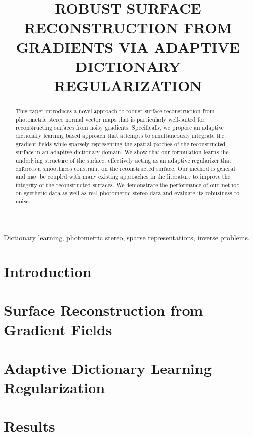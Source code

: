 \documentclass{article}
\title{ROBUST SURFACE RECONSTRUCTION FROM GRADIENTS VIA ADAPTIVE DICTIONARY REGULARIZATION}
\begin{document}

\maketitle

\begin{abstract}
This paper introduces a novel approach to robust surface reconstruction from photometric stereo normal vector maps that is particularly well-suited for reconstructing surfaces from noisy gradients. Specifically, we propose an adaptive dictionary learning based approach that attempts to simultaneously integrate the gradient fields while sparsely representing the spatial patches of the reconstructed surface in an adaptive dictionary domain. We show that our formulation learns the underlying structure of the surface, effectively acting as an adaptive regularizer that enforces a smoothness constraint on the reconstructed surface. Our method is general and may be coupled with many existing approaches in the literature to improve the integrity of the reconstructed surfaces. We demonstrate the performance of our method on synthetic data as well as real photometric stereo data and evaluate its robustness to noise.
\end{abstract}

\begin{keywords}
Dictionary learning, photometric stereo, sparse representations, inverse problems.
\end{keywords}

\section{Introduction} \label{sec:intro}


\section{Surface Reconstruction from Gradient Fields} \label{sec:background}


\section{Adaptive Dictionary Learning Regularization} \label{sec:dl}


\section{Results} \label{sec:results}

\end{document}
